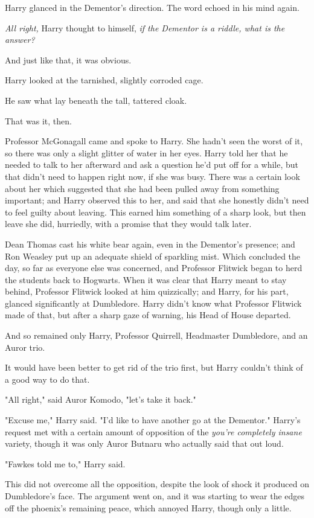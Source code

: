 Harry glanced in the Dementor's direction. The word echoed in his mind again.

\emph{All right,} Harry thought to himself, \emph{if the Dementor is a riddle,
what is the answer?}

And just like that, it was obvious.

Harry looked at the tarnished, slightly corroded cage.

He saw what lay beneath the tall, tattered cloak.

That was it, then.

Professor McGonagall came and spoke to Harry. She hadn't seen the worst of it,
so there was only a slight glitter of water in her eyes. Harry told her that he
needed to talk to her afterward and ask a question he'd put off for a while,
but that didn't need to happen right now, if she was busy. There was a certain
look about her which suggested that she had been pulled away from something
important; and Harry observed this to her, and said that she honestly didn't
need to feel guilty about leaving. This earned him something of a sharp look,
but then leave she did, hurriedly, with a promise that they would talk later.

Dean Thomas cast his white bear again, even in the Dementor's presence; and Ron
Weasley put up an adequate shield of sparkling mist. Which concluded the day,
so far as everyone else was concerned, and Professor Flitwick began to herd the
students back to Hogwarts. When it was clear that Harry meant to stay behind,
Professor Flitwick looked at him quizzically; and Harry, for his part, glanced
significantly at Dumbledore. Harry didn't know what Professor Flitwick made of
that, but after a sharp gaze of warning, his Head of House departed.

And so remained only Harry, Professor Quirrell, Headmaster Dumbledore, and an
Auror trio.

It would have been better to get rid of the trio first, but Harry couldn't
think of a good way to do that.

"All right," said Auror Komodo, "let's take it back."

"Excuse me," Harry said. "I'd like to have another go at the Dementor."
\sbreak
Harry's request met with a certain amount of opposition of the \emph{you're
completely insane} variety, though it was only Auror Butnaru who actually said
that out loud.

"Fawkes told me to," Harry said.

This did not overcome all the opposition, despite the look of shock it produced
on Dumbledore's face. The argument went on, and it was starting to wear the
edges off the phoenix's remaining peace, which annoyed Harry, though only a
little.

